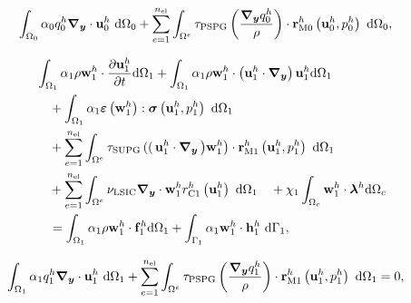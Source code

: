 \documentclass[tese_patricia]{subfiles}
\begin{document}
\begin{align}
	\begin{split}
		&	\int_{\Omega_0} \alpha_0 q_0^h \boldsymbol{\nabla_y} \cdot \mathbf{u}_0^h \ \mathrm{d} \Omega_0 +
		\sum_{e=1}^{n_{\mathrm{el}}} \int_{\Omega^e} \tau_{\mathrm{PSPG}} \left(\frac{\boldsymbol{\nabla_y} q_0^h}{\rho}\right) \cdot \mathbf{r}_{\mathrm{M0}}^{h}\left(\mathbf{u}_0^h,p_0^h\right) \  \mathrm{d} \Omega_0,
		\label{eq:C_forma_fraca_0_atu}
	\end{split}
\end{align}


\begin{align}
	\begin{split}
		&\int_{\localModel} \arlequinWFLocal \density \wlocalh \cdot \frac{\partial\ulocalh}{\partial t} \deriv \localModel +
		\int_{\localModel} \arlequinWFLocal \density \wlocalh \cdot  \left(\ulocalh \cdot \gradient \right)\ulocalh \deriv \localModel  \\ 
		&\quad+	
		\int_{\localModel} \arlequinWFLocal \straintensor \left(\wlocalh\right) : \stresstensor \left(\ulocalh,\plocalh\right)\ \deriv \localModel 
		\\ 
		&\quad+ \sum_{e=1}^{\nel} \int_{\domainE} \SUPG  \left( \right(\ulocalh \cdot \gradient \left) \wlocalh\right) \cdot \resMomLocal\left(\ulocalh,\plocalh \right)\  \deriv \localModel \\ 
		&\quad+\sum_{e=1}^{\nel} \int_{\domainE} \LSIC \divergence \cdot \wlocalh \resPreLocal
		\left(\ulocalh\right)\  \deriv \localModel 
		\quad+ \chi_{1} \int_{\gluingZone} \wlocalh \cdot \lagrangeMultiplierh \deriv \gluingZone  \\
		&\quad= \int_{\localModel} \arlequinWFLocal \density \wlocalh \cdot  \localsbodyforceh \deriv \localModel + \int_{\localBoundary} \arlequinWFLocal \wlocalh \cdot \localSurfaceLoadh\ \deriv \localBoundary,
		\label{eq:QM_forma_fraca_1_atu}
	\end{split}
\end{align}


\begin{align}
	\begin{split}
		&	\int_{\Omega_1} \alpha_1 q_1^h \boldsymbol{\nabla_y} \cdot \mathbf{u}_1^h \ \mathrm{d} \Omega_1 +
		\sum_{e=1}^{n_{\mathrm{el}}} \int_{\Omega^e} \tau_{\mathrm{PSPG}} \left(\frac{\boldsymbol{\nabla_y} q_1^h}{\rho}\right) \cdot \mathbf{r}_{\mathrm{M1}}^{h} \left(\mathbf{u}_1^h,p_1^h\right) \  \mathrm{d} \Omega_1 = 0,
		\label{eq:C_forma_fraca_1_atu}
	\end{split}
\end{align}
\end{document}
